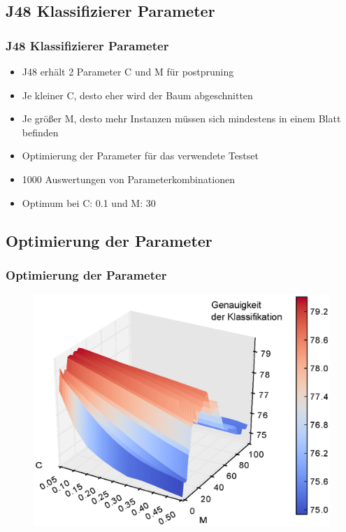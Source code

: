 \documentclass[accentcolor=tud6b,colorbacktitle,inverttitle,landscape,german,presentation,t]{tudbeamer}
\begin{document}
	\subsection{J48 Klassifizierer Parameter}
		\begin{frame}
		\frametitle{J48 Klassifizierer Parameter}
		\begin{itemize}
		\item J48 erhält 2 Parameter C und M für postpruning
		\item Je kleiner C, desto eher wird der Baum abgeschnitten
		\item Je größer M, desto mehr Instanzen müssen sich mindestens in einem Blatt befinden
		\item Optimierung der Parameter für das verwendete Testset
		\item 1000 Auswertungen von Parameterkombinationen
		\item Optimum bei C: 0.1 und M: 30
		\end{itemize}
		\end{frame}

	\subsection{Optimierung der Parameter}
		\begin{frame}
		\frametitle{Optimierung der Parameter}
		\begin{figure}[Hh]
    		\includegraphics[width=\textwidth,height=\textheight,keepaspectratio]{./img/parameter.eps}
		\end{figure}
		\end{frame}
\end{document}
